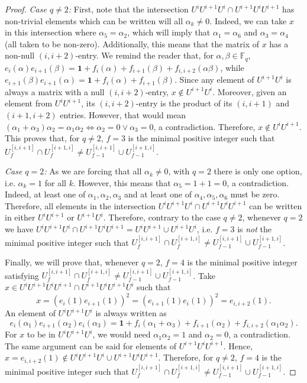 \documentclass[11pt,letterpaper]{amsart}
\newcommand{\FF}{\mathbb{F}}
\begin{document}
\begin{proof}
    \textit{Case $q\neq 2$:} First, note that the intersection $U^iU^{i+1}U^i\cap U^{i+1}U^{i}U^{i+1}$ has non-trivial elements which can be written will all $\alpha_k\neq 0$. Indeed, we can take $x$ in this intersection where $\alpha_5=\alpha_2$, which will imply that $\alpha_1=\alpha_6$ and $\alpha_3=\alpha_4$ (all taken to be non-zero).
    Additionally, this means that the matrix of $x$ has a non-null $(i,i+2)$-entry. We remind the reader that, for $\alpha,\beta\in\FF_q$, $e_{i}(\alpha)e_{i+1}(\beta) = \mathbf{1} + f_i(\alpha)+f_{i+1}(\beta)+f_{i,i+2}(\alpha\beta)$, while $e_{i+1}(\beta)e_{i+1}(\alpha) = \mathbf{1} + f_i(\alpha)+f_{i+1}(\beta)$. Since
    any element of $U^{i+1}U^i$ is always a matrix with a null $(i,i+2)$-entry, $x\notin U^{i+1}U^i$. Moreover, given an element from $U^{i}U^{i+1}$, its $(i,i+2)$-entry is the product of its $(i,i+1)$ and $(i+1,i+2)$ entries. However, that would mean $(\alpha_1+\alpha_3)\alpha_2 = \alpha_1\alpha_2 \Leftrightarrow \alpha_2 = 0 \vee \alpha_3 = 0$, a contradiction. Therefore, $x\notin U^{i}U^{i+1}$.
    This proves that, for $q\neq 2$, $f=3$ is the minimal positive integer such that 
    $U^{[i,i+1]}_f\cap U^{[i+1,i]}_f\neq U^{[i,i+1]}_{f-1}\cup U^{[i+1,i]}_{f-1}$.
    
    \textit{Case $q=2$:} As we are forcing that all $\alpha_k\neq 0$, with $q=2$ there is only one option, i.e. $\alpha_k=1$ for all $k$. However, this means that $\alpha_5 = 1 + 1 = 0$, a contradiction. Indeed, at least one of ${\alpha_1,\alpha_2,\alpha_3}$ and at least one of ${\alpha_4,\alpha_5,\alpha_6}$ must be zero.
    Therefore, all elements in the intersection $U^iU^{i+1}U^i\cap U^{i+1}U^{i}U^{i+1}$ can be written in either $U^iU^{i+1}$ or $U^{i+1}U^{i}$.
    Therefore, contrary to the case $q\neq 2$, whenever $q=2$ we have $ U^iU^{i+1}U^i\cap U^{i+1}U^{i}U^{i+1}= U^iU^{i+1}\cup U^{i+1}U^i$, i.e. $f=3$ is \emph{not} the minimal positive integer such that $U^{[i,i+1]}_f\cap U^{[i+1,i]}_f\neq U^{[i,i+1]}_{f-1}\cup U^{[i+1,i]}_{f-1}$. 

    Finally, we will prove that, whenever $q=2$, $f=4$ is the minimal positive integer satisfying $U^{[i,i+1]}_f\cap U^{[i+1,i]}_f\neq U^{[i,i+1]}_{f-1}\cup U^{[i+1,i]}_{f-1}$. Take $x\in U^iU^{i+1}U^iU^{i+1}\cap U^{i+1}U^{i}U^{i+1}U^i$  such that $$x=(e_i(1)e_{i+1}(1))^2 = (e_{i+1}(1)e_i(1))^2=e_{i,i+2}(1).$$
    An element of $U^iU^{i+1}U^i$ is always written as $$e_i(\alpha_1)e_{i+1}(\alpha_2)e_{i}(\alpha_3)=\mathbf{1}+f_i(\alpha_1+\alpha_3)+f_{i+1}(\alpha_2)+f_{i,i+2}(\alpha_1\alpha_2).$$
    For $x$ to be in $U^iU^{i+1}U^i$, we would need $\alpha_1\alpha_2=1$ and $\alpha_2=0$, a contradiction. The same argument can be said for elements of $U^{i+1}U^iU^{i+1}$. Hence, $x=e_{i,i+2}(1)\notin U^iU^{i+1}U^i\cup U^{i+1}U^iU^{i+1}$. Therefore, for $q\neq 2$, $f=4$ is the minimal positive integer such that 
    $U^{[i,i+1]}_f\cap U^{[i+1,i]}_f\neq U^{[i,i+1]}_{f-1}\cup U^{[i+1,i]}_{f-1}$.
\end{proof}
\end{document}
